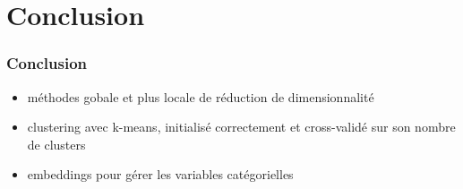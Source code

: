 \documentclass{formation}
\begin{document}
\section{Conclusion}

\begin{frame}
  \frametitle{Conclusion}

  \begin{itemize}
  \item méthodes gobale et \og plus locale\fg{} de réduction de
    dimensionnalité
  \item clustering avec k-means, initialisé correctement et
    cross-validé sur son nombre de clusters
  \item embeddings pour gérer les variables catégorielles
  \end{itemize}
\end{frame}
\end{document}
